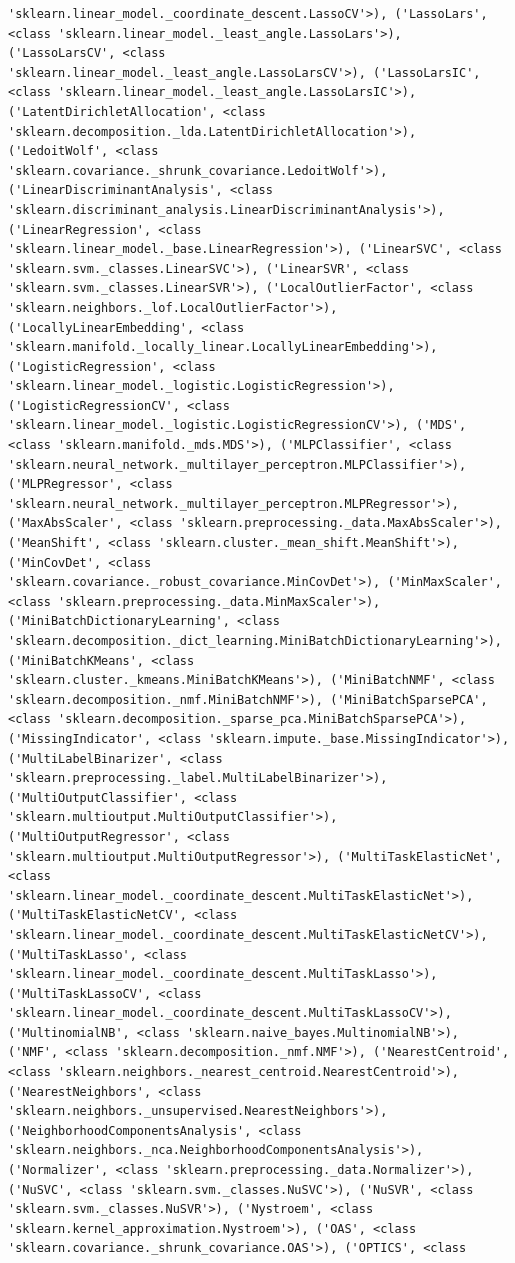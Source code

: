 \documentclass[
  letterpaper,
  DIV=11,
  numbers=noendperiod]{scrreprt}
\begin{document}
\begin{verbatim}
'sklearn.linear_model._coordinate_descent.LassoCV'>), ('LassoLars', <class 'sklearn.linear_model._least_angle.LassoLars'>), ('LassoLarsCV', <class 'sklearn.linear_model._least_angle.LassoLarsCV'>), ('LassoLarsIC', <class 'sklearn.linear_model._least_angle.LassoLarsIC'>), ('LatentDirichletAllocation', <class 'sklearn.decomposition._lda.LatentDirichletAllocation'>), ('LedoitWolf', <class 'sklearn.covariance._shrunk_covariance.LedoitWolf'>), ('LinearDiscriminantAnalysis', <class 'sklearn.discriminant_analysis.LinearDiscriminantAnalysis'>), ('LinearRegression', <class 'sklearn.linear_model._base.LinearRegression'>), ('LinearSVC', <class 'sklearn.svm._classes.LinearSVC'>), ('LinearSVR', <class 'sklearn.svm._classes.LinearSVR'>), ('LocalOutlierFactor', <class 'sklearn.neighbors._lof.LocalOutlierFactor'>), ('LocallyLinearEmbedding', <class 'sklearn.manifold._locally_linear.LocallyLinearEmbedding'>), ('LogisticRegression', <class 'sklearn.linear_model._logistic.LogisticRegression'>), ('LogisticRegressionCV', <class 'sklearn.linear_model._logistic.LogisticRegressionCV'>), ('MDS', <class 'sklearn.manifold._mds.MDS'>), ('MLPClassifier', <class 'sklearn.neural_network._multilayer_perceptron.MLPClassifier'>), ('MLPRegressor', <class 'sklearn.neural_network._multilayer_perceptron.MLPRegressor'>), ('MaxAbsScaler', <class 'sklearn.preprocessing._data.MaxAbsScaler'>), ('MeanShift', <class 'sklearn.cluster._mean_shift.MeanShift'>), ('MinCovDet', <class 'sklearn.covariance._robust_covariance.MinCovDet'>), ('MinMaxScaler', <class 'sklearn.preprocessing._data.MinMaxScaler'>), ('MiniBatchDictionaryLearning', <class 'sklearn.decomposition._dict_learning.MiniBatchDictionaryLearning'>), ('MiniBatchKMeans', <class 'sklearn.cluster._kmeans.MiniBatchKMeans'>), ('MiniBatchNMF', <class 'sklearn.decomposition._nmf.MiniBatchNMF'>), ('MiniBatchSparsePCA', <class 'sklearn.decomposition._sparse_pca.MiniBatchSparsePCA'>), ('MissingIndicator', <class 'sklearn.impute._base.MissingIndicator'>), ('MultiLabelBinarizer', <class 'sklearn.preprocessing._label.MultiLabelBinarizer'>), ('MultiOutputClassifier', <class 'sklearn.multioutput.MultiOutputClassifier'>), ('MultiOutputRegressor', <class 'sklearn.multioutput.MultiOutputRegressor'>), ('MultiTaskElasticNet', <class 'sklearn.linear_model._coordinate_descent.MultiTaskElasticNet'>), ('MultiTaskElasticNetCV', <class 'sklearn.linear_model._coordinate_descent.MultiTaskElasticNetCV'>), ('MultiTaskLasso', <class 'sklearn.linear_model._coordinate_descent.MultiTaskLasso'>), ('MultiTaskLassoCV', <class 'sklearn.linear_model._coordinate_descent.MultiTaskLassoCV'>), ('MultinomialNB', <class 'sklearn.naive_bayes.MultinomialNB'>), ('NMF', <class 'sklearn.decomposition._nmf.NMF'>), ('NearestCentroid', <class 'sklearn.neighbors._nearest_centroid.NearestCentroid'>), ('NearestNeighbors', <class 'sklearn.neighbors._unsupervised.NearestNeighbors'>), ('NeighborhoodComponentsAnalysis', <class 'sklearn.neighbors._nca.NeighborhoodComponentsAnalysis'>), ('Normalizer', <class 'sklearn.preprocessing._data.Normalizer'>), ('NuSVC', <class 'sklearn.svm._classes.NuSVC'>), ('NuSVR', <class 'sklearn.svm._classes.NuSVR'>), ('Nystroem', <class 'sklearn.kernel_approximation.Nystroem'>), ('OAS', <class 'sklearn.covariance._shrunk_covariance.OAS'>), ('OPTICS', <class 
\end{verbatim}
\end{document}
